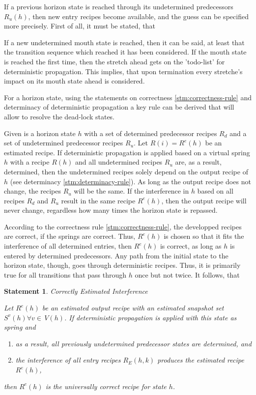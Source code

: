 \documentclass[12pt,a4paper]{scrartcl}
\newtheorem{statement}{Statement}
\begin{document}
If a previous horizon state is reached through its undetermined predecessors
$R_u(h)$, then new entry recipes become available, and the guess can be
specified more precisely. First of all, it must be stated, that 


If a new undetermined mouth state is reached, then it can be said, at least
that the transition sequence which reached it has been considered. If the mouth
state is reached the first time, then the stretch ahead gets on the 'todo-list'
for deterministic propagation. This implies, that upon termination every
stretche's impact on its mouth state ahead is considered.


For a horizon state, using the statements on correctness
\ref{stm:correctness-rule} and determinacy \label{stm:determinacy} of
deterministic propagation a key rule can be derived that will allow to resolve
the dead-lock states.

Given is a horizon state $h$ with a set of determined predecessor recipes $R_d$
and a set of undetermined predecessor recipes $R_u$. Let $R(i)=R^e(h)$ be an
estimated recipe. If deterministic propagation is applied based on a virtual
spring $h$ with a recipe $R(h)$ and all undetermined recipes $R_u$ are,
as a result, determined, then the undetermined recipes solely depend on the 
output recipe of $h$ (see determinacy \ref{stm:determinacy-rule}). As long
as the output recipe does not change, the recipes $R_u$ will be the same. 
If the interference in $h$ based on all recipes $R_d$ and $R_u$ result in the
same recipe $R^e(h)$, then the output recipe will never change, regardless how
many times the horizon state is repassed. 

According to the correctness rule \ref{stm:correctness-rule}, the developped
recipes are correct, if the springs are correct. Thus, $R^e(h)$ is chosen 
so that it fits the interference of all determined entries, then $R^e(h)$
is correct, as long as $h$ is entered by determined predecessors. Any path
from the initial state to the horizon state, though, goes through deterministic
recipes. Thus, it is primarily true for all transitions that pass through $h$
once but not twice. It follows, that

\begin{statement} Correctly Estimated Interference

    Let  $R^e(h)$ be an estimated output recipe with an estimated snapshot set
    $S^v(h)\forall v\in\,V(h)$. If deterministic propagation is applied with this
    state as spring and 

    \begin{enumerate}
        \item as a result, all previously undetermined predecessor states are
              determined, and
        \item the interference of all entry recipes $R_E(h,k)$ produces the 
              estimated recipe $R^e(h)$, 
    \end{enumerate}

    then $R^e(h)$ is the universally correct recipe for state $h$.
    
\end{statement}
\end{document}
